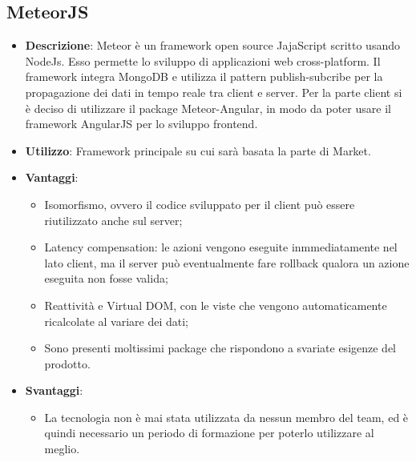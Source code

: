\subsection{MeteorJS}
\begin{itemize}
	\item \textbf{Descrizione}: Meteor è un framework open source JajaScript scritto usando NodeJs. Esso permette lo sviluppo di applicazioni web cross-platform. Il framework integra MongoDB e utilizza il pattern publish-subcribe per la propagazione dei dati in tempo reale tra client e server. Per la parte client si è deciso di utilizzare il package Meteor-Angular, in modo da poter usare il framework AngularJS per lo sviluppo frontend.
	\item \textbf{Utilizzo}: Framework principale su cui sarà basata la parte di Market.
	\item \textbf{Vantaggi}:
	\begin{itemize}
		\item Isomorfismo, ovvero il codice sviluppato per il client può essere riutilizzato anche sul server;
		\item Latency compensation: le azioni vengono eseguite inmmediatamente nel lato client, ma il server può eventualmente fare rollback qualora un azione eseguita non fosse valida;
		\item Reattività e Virtual DOM, con le viste che vengono automaticamente ricalcolate al variare dei dati;
		\item Sono presenti moltissimi package che rispondono a svariate esigenze del prodotto.
	\end{itemize}
	\item \textbf{Svantaggi}:
	\begin{itemize}
		\item La tecnologia non è mai stata utilizzata da nessun membro del team, ed è quindi necessario un periodo di formazione per poterlo utilizzare al meglio.
	\end{itemize}
\end{itemize}

